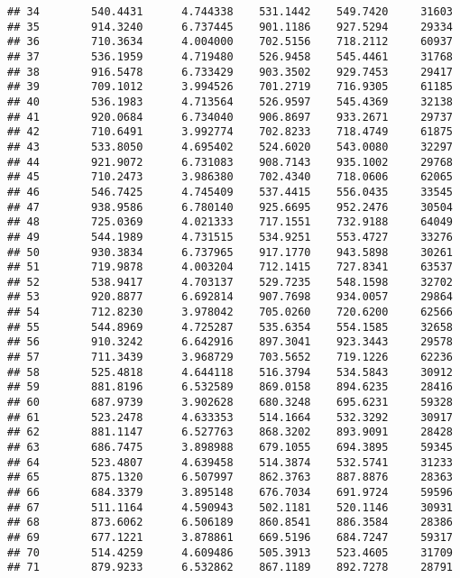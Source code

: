 \documentclass[]{article}
\begin{document}
\begin{verbatim}
## 34        540.4431      4.744338    531.1442    549.7420     31603
## 35        914.3240      6.737445    901.1186    927.5294     29334
## 36        710.3634      4.004000    702.5156    718.2112     60937
## 37        536.1959      4.719480    526.9458    545.4461     31768
## 38        916.5478      6.733429    903.3502    929.7453     29417
## 39        709.1012      3.994526    701.2719    716.9305     61185
## 40        536.1983      4.713564    526.9597    545.4369     32138
## 41        920.0684      6.734040    906.8697    933.2671     29737
## 42        710.6491      3.992774    702.8233    718.4749     61875
## 43        533.8050      4.695402    524.6020    543.0080     32297
## 44        921.9072      6.731083    908.7143    935.1002     29768
## 45        710.2473      3.986380    702.4340    718.0606     62065
## 46        546.7425      4.745409    537.4415    556.0435     33545
## 47        938.9586      6.780140    925.6695    952.2476     30504
## 48        725.0369      4.021333    717.1551    732.9188     64049
## 49        544.1989      4.731515    534.9251    553.4727     33276
## 50        930.3834      6.737965    917.1770    943.5898     30261
## 51        719.9878      4.003204    712.1415    727.8341     63537
## 52        538.9417      4.703137    529.7235    548.1598     32702
## 53        920.8877      6.692814    907.7698    934.0057     29864
## 54        712.8230      3.978042    705.0260    720.6200     62566
## 55        544.8969      4.725287    535.6354    554.1585     32658
## 56        910.3242      6.642916    897.3041    923.3443     29578
## 57        711.3439      3.968729    703.5652    719.1226     62236
## 58        525.4818      4.644118    516.3794    534.5843     30912
## 59        881.8196      6.532589    869.0158    894.6235     28416
## 60        687.9739      3.902628    680.3248    695.6231     59328
## 61        523.2478      4.633353    514.1664    532.3292     30917
## 62        881.1147      6.527763    868.3202    893.9091     28428
## 63        686.7475      3.898988    679.1055    694.3895     59345
## 64        523.4807      4.639458    514.3874    532.5741     31233
## 65        875.1320      6.507997    862.3763    887.8876     28363
## 66        684.3379      3.895148    676.7034    691.9724     59596
## 67        511.1164      4.590943    502.1181    520.1146     30931
## 68        873.6062      6.506189    860.8541    886.3584     28386
## 69        677.1221      3.878861    669.5196    684.7247     59317
## 70        514.4259      4.609486    505.3913    523.4605     31709
## 71        879.9233      6.532862    867.1189    892.7278     28791

\end{verbatim}
\end{document}
